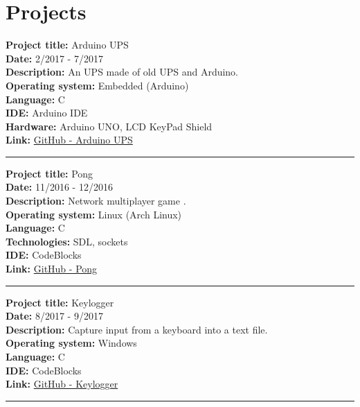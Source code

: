 \documentclass[slovak]{article}
\begin{document}
\section*{Projects}\label{projects}

\textbf{Project title:} Arduino UPS\\
\textbf{Date:} 2/2017 - 7/2017\\
\textbf{Description:} An UPS made of old UPS and Arduino.\\
\textbf{Operating system:} Embedded (Arduino)\\
\textbf{Language:} C\\
\textbf{IDE:} Arduino IDE\\
\textbf{Hardware:} Arduino UNO, LCD KeyPad Shield\\
\textbf{Link:} \href{https://github.com/kyberdrb/Arduino\_UPS}{GitHub - Arduino UPS}

\begin{center}\rule{3in}{0.4pt}\end{center}

\noindent
\textbf{Project title:} Pong\\
\textbf{Date:} 11/2016 - 12/2016\\
\textbf{Description:} Network multiplayer game .\\
\textbf{Operating system:} Linux (Arch Linux)\\
\textbf{Language:} C\\
\textbf{Technologies:} SDL, sockets\\
\textbf{IDE:} CodeBlocks\\
\textbf{Link:} \href{https://github.com/kyberdrb/semestralka\_vstavane\_systemy}{GitHub - Pong}

\begin{center}\rule{3in}{0.4pt}\end{center}

\noindent
\textbf{Project title:} Keylogger\\
\textbf{Date:} 8/2017 - 9/2017\\
\textbf{Description:} Capture input from a keyboard into a text file.\\
\textbf{Operating system:} Windows\\
\textbf{Language:} C\\
\textbf{IDE:} CodeBlocks\\
\textbf{Link:} \href{https://github.com/kyberdrb/windows\_keylogger}{GitHub - Keylogger}

\begin{center}\rule{3in}{0.4pt}\end{center}
\end{document}
